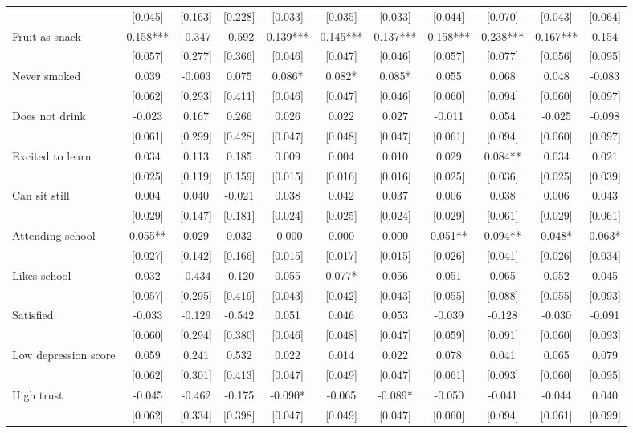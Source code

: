 \documentclass[12pt]{article}
\begin{document}
\begin{table}[ht]
\begin{center}
\begin{adjustbox}{width=1.2\textwidth,center=\textwidth}
\begin{tabular}{l*{10}{c}}
 & [0.045] & [0.163] & [0.228] & [0.033] & [0.035] & [0.033] & [0.044] & [0.070] & [0.043] & [0.064] \\
Fruit as snack & 0.158*** & -0.347 & -0.592 & 0.139*** & 0.145*** & 0.137*** & 0.158*** & 0.238*** & 0.167*** & 0.154 \\
 & [0.057] & [0.277] & [0.366] & [0.046] & [0.047] & [0.046] & [0.057] & [0.077] & [0.056] & [0.095] \\
Never smoked & 0.039 & -0.003 & 0.075 & 0.086* & 0.082* & 0.085* & 0.055 & 0.068 & 0.048 & -0.083 \\
 & [0.062] & [0.293] & [0.411] & [0.046] & [0.047] & [0.046] & [0.060] & [0.094] & [0.060] & [0.097] \\
Does not drink & -0.023 & 0.167 & 0.266 & 0.026 & 0.022 & 0.027 & -0.011 & 0.054 & -0.025 & -0.098 \\
 & [0.061] & [0.299] & [0.428] & [0.047] & [0.048] & [0.047] & [0.061] & [0.094] & [0.060] & [0.097] \\
Excited to learn & 0.034 & 0.113 & 0.185 & 0.009 & 0.004 & 0.010 & 0.029 & 0.084** & 0.034 & 0.021 \\
 & [0.025] & [0.119] & [0.159] & [0.015] & [0.016] & [0.016] & [0.025] & [0.036] & [0.025] & [0.039] \\
Can sit still & 0.004 & 0.040 & -0.021 & 0.038 & 0.042 & 0.037 & 0.006 & 0.038 & 0.006 & 0.043 \\
 & [0.029] & [0.147] & [0.181] & [0.024] & [0.025] & [0.024] & [0.029] & [0.061] & [0.029] & [0.061] \\
Attending school & 0.055** & 0.029 & 0.032 & -0.000 & 0.000 & 0.000 & 0.051** & 0.094** & 0.048* & 0.063* \\
 & [0.027] & [0.142] & [0.166] & [0.015] & [0.017] & [0.015] & [0.026] & [0.041] & [0.026] & [0.034] \\
Likes school & 0.032 & -0.434 & -0.120 & 0.055 & 0.077* & 0.056 & 0.051 & 0.065 & 0.052 & 0.045 \\
 & [0.057] & [0.295] & [0.419] & [0.043] & [0.042] & [0.043] & [0.055] & [0.088] & [0.055] & [0.093] \\
Satisfied & -0.033 & -0.129 & -0.542 & 0.051 & 0.046 & 0.053 & -0.039 & -0.128 & -0.030 & -0.091 \\
 & [0.060] & [0.294] & [0.380] & [0.046] & [0.048] & [0.047] & [0.059] & [0.091] & [0.060] & [0.093] \\
Low depression score & 0.059 & 0.241 & 0.532 & 0.022 & 0.014 & 0.022 & 0.078 & 0.041 & 0.065 & 0.079 \\
 & [0.062] & [0.301] & [0.413] & [0.047] & [0.049] & [0.047] & [0.061] & [0.093] & [0.060] & [0.095] \\
High trust & -0.045 & -0.462 & -0.175 & -0.090* & -0.065 & -0.089* & -0.050 & -0.041 & -0.044 & 0.040 \\
 & [0.062] & [0.334] & [0.398] & [0.047] & [0.049] & [0.047] & [0.060] & [0.094] & [0.061] & [0.099] \\


\end{tabular}
\end{adjustbox}
\end{center}
\end{table}
\end{document}
